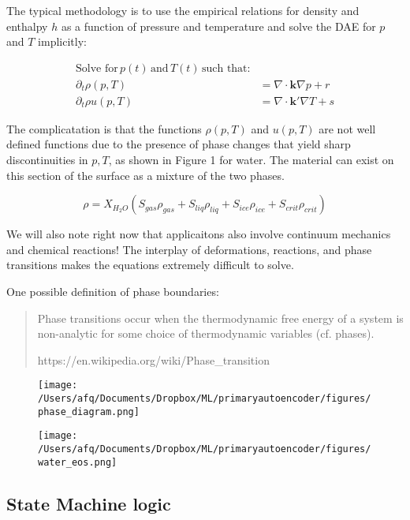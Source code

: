 \documentclass[]{article}
\begin{document}
The typical methodology is to use the empirical relations for density
and enthalpy \(h\) as a function of pressure and temperature and solve
the DAE for \(p\) and \(T\) implicitly:

\begin{align}
\text{Solve for}\, p(t)\, \text{and}\, T(t)\, \text{such that:}\\
\partial_t \rho(p,T) & = \nabla \cdot \mathbf{k}\nabla p + r\\
\partial_t \rho u(p,T) & = \nabla \cdot \mathbf{k'}\nabla T + s
\end{align}

The complicatation is that the functions \(\rho(p,T)\) and \(u(p,T)\)
are not well defined functions due to the presence of phase changes that
yield sharp discontinuities in \(p,T\), as shown in Figure 1 for water.
The material can exist on this section of the surface as a mixture of
the two phases.

\[\rho = X_{H_2O}\left(S_{gas} \rho_{gas} + S_{liq} \rho_{liq} + S_{ice} \rho_{ice} + S_{crit} \rho_{crit} \right)\]

We will also note right now that applicaitons also involve continuum
mechanics and chemical reactions! The interplay of deformations,
reactions, and phase transitions makes the equations extremely difficult
to solve.

One possible definition of phase boundaries:

\begin{quote}
Phase transitions occur when the thermodynamic free energy of a system
is non-analytic for some choice of thermodynamic variables (cf. phases).

https://en.wikipedia.org/wiki/Phase\_transition
\end{quote}

\begin{figure}
\centering
\texttt{[image: /Users/afq/Documents/Dropbox/ML/primaryautoencoder/figures/phase\_diagram.png]}
\caption{}
\end{figure}

\begin{figure}
\centering
\texttt{[image: /Users/afq/Documents/Dropbox/ML/primaryautoencoder/figures/water\_eos.png]}
\caption{}
\end{figure}

\hypertarget{header-n3253}{%
\subsection{State Machine logic}\label{header-n3253}}
\end{document}
